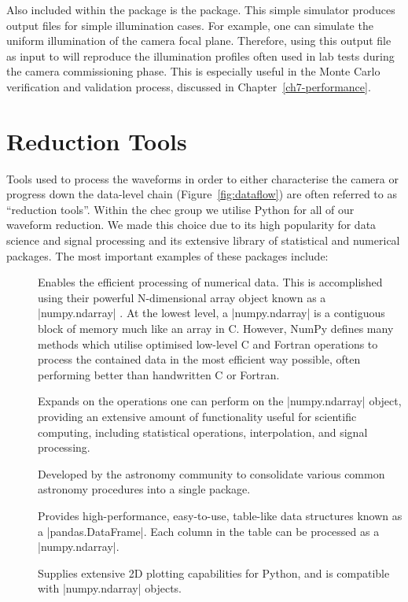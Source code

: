 Also included within the  package is the  package. This simple simulator produces  output files for simple illumination cases. For example, one can simulate the uniform illumination of the camera focal plane. Therefore, using this  output file as input to  will reproduce the illumination profiles often used in lab tests during the camera commissioning phase. This is especially useful in the Monte Carlo verification and validation process, discussed in Chapter~\ref{ch7-performance}.

\section{Reduction Tools}
\lstset{language=C++}

Tools used to process the waveforms in order to either characterise the camera or progress down the data-level chain (Figure~\ref{fig:dataflow}) are often referred to as ``reduction tools''. Within the \gls{chec} group we utilise Python for all of our waveform reduction. We made this choice due to its high popularity for data science and signal processing and its extensive library of statistical and numerical packages. The most important examples of these packages include:

\begin{description}
\item []  Enables the efficient processing of numerical data. This is accomplished using their powerful N-dimensional array object known as a |numpy.ndarray| \cite{VanderWalt2011}. At the lowest level, a |numpy.ndarray| is a contiguous block of memory much like an array in C. However, NumPy defines many methods which utilise optimised low-level C and Fortran operations to process the contained data in the most efficient way possible, often performing better than handwritten C or Fortran.
\item []  Expands on the operations one can perform on the |numpy.ndarray| object, providing an extensive amount of functionality useful for scientific computing, including statistical operations, interpolation, and signal processing.
\item []  Developed by the astronomy community to consolidate various common astronomy procedures into a single package. 
\item []  Provides high-performance, easy-to-use, table-like data structures known as a |pandas.DataFrame|. Each column in the table can be processed as a |numpy.ndarray|.
\item []  Supplies extensive 2D plotting capabilities for Python, and is compatible with |numpy.ndarray| objects.
\end{description}


